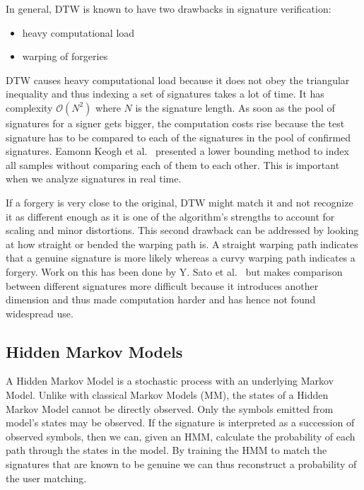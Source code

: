 \documentclass[a4paper, oneside]{csthesis}
\begin{document}
In general, DTW is known to have two drawbacks in signature verification:
\begin{itemize}
\item heavy computational load
\item warping of forgeries
\end{itemize}

DTW causes heavy computational load because it does not obey the triangular inequality and thus indexing a set of signatures takes a lot of time. It has complexity $\mathcal{O}(N^2)$ where $N$ is the signature length. As soon as the pool of signatures for a signer gets bigger, the computation costs rise because the test signature has to be compared to each of the signatures in the pool of confirmed signatures. Eamonn Keogh et al.~\cite{Keogh:2002:EID:1287369.1287405} presented a lower bounding method to index all samples without comparing each of them to each other. This is important when we analyze signatures in real time.

If a forgery is very close to the original, DTW might match it and not recognize it as different enough as it is one of the algorithm's strengths to account for scaling and minor distortions. This second drawback can be addressed by looking at how straight or bended the warping path is. A straight warping path indicates that a genuine signature is more likely whereas a curvy warping path indicates a forgery. Work on this has been done by Y. Sato et al.~\cite{Sato1982} but makes comparison between different signatures more difficult because it introduces another dimension and thus made computation harder and has hence not found widespread use.






\newpage
\subsection{Hidden Markov Models}


A Hidden Markov Model is a stochastic process with an underlying Markov Model.
Unlike with classical Markov Models (MM), the states of a Hidden Markov Model cannot be directly observed. Only the symbols emitted from model's states may be observed. If the signature is interpreted as a succession of observed symbols, then we can, given an HMM, calculate the probability of each path through the states in the model. By training the HMM to match the signatures that are known to be genuine we can thus reconstruct a probability of the user matching.
\end{document}
